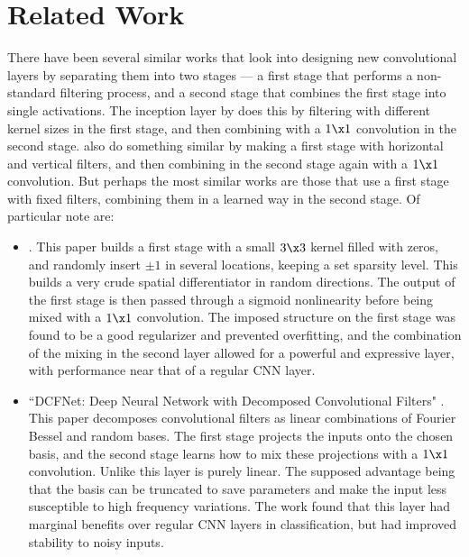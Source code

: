 \section{Related Work}\label{sec:ch5:related}

There have been several similar works that look into designing new convolutional
layers by separating them into two stages --- a first stage that performs a
non-standard filtering process, and a second stage that combines the first stage
into single activations. The inception layer 
\cite{szegedy_rethinking_2015} by \citeauthor*{szegedy_rethinking_2015} does this by filtering with different
kernel sizes in the first stage, and then combining with a $1\x 1$ convolution
in the second stage. \citeauthor*{ioannou_training_2015} also do something similar by making
a first stage with horizontal and vertical filters, and then combining in the
second stage again with a $1\x 1$ convolution\cite{ioannou_training_2015}. But perhaps the most similar
works are those that use a first stage with fixed filters, combining them in a
learned way in the second stage. Of particular note are:
\begin{itemize}
\item 
{} \cite{juefei-xu_local_2016}. This paper builds a
first stage with a small $3\x 3$ kernel filled with zeros, and randomly insert
$\pm 1$ in several locations, keeping a set sparsity level. This builds a very
crude spatial differentiator in random directions. The output of the first stage
is then passed through a sigmoid nonlinearity before being mixed with a $1\x 1$
convolution. The imposed structure on the first stage was found to be a good
regularizer and prevented overfitting, and the combination of the mixing in the
second layer allowed for a powerful and expressive layer, with performance near
that of a regular CNN layer.

\item
``DCFNet: Deep Neural Network with Decomposed Convolutional Filters"
\cite{qiu_dcfnet:_2018}. This paper decomposes convolutional filters as linear
combinations of Fourier Bessel and random bases.  The first stage projects the
inputs onto the chosen basis, and the second stage learns how to mix these
projections with a $1\x 1$ convolution. Unlike \cite{juefei-xu_local_2016} this
layer is purely linear. The supposed advantage being that the
basis can be truncated to save parameters and make the input less susceptible to
high frequency variations. The work found that this layer had marginal benefits
over regular CNN layers in classification, but had improved stability to noisy
inputs. 

\end{itemize}


